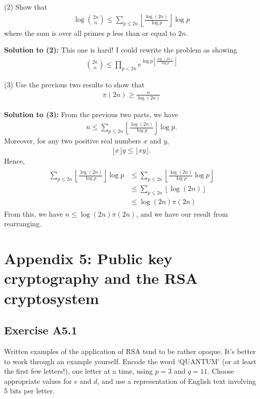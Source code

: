 \documentclass{book}
\begin{document}
    (2) Show that
    \begin{align}
        \log \binom{2n}{n} \leq \sum_{p\leq2n} \left\lfloor\frac{\log(2n)}{\log p} \right\rfloor\log p
    \end{align}
    where the sum is over all primes $p$ less than or equal to $2n$.

    \textbf{Solution to (2):} This one is hard! I could rewrite the problem as showing
    \begin{align}
        \binom{2n}{n} \leq \prod_{p<2n}e^{\log p \left\lfloor\frac{\log(2n)}{\log p}\right\rfloor}
    \end{align}

    (3) Use the previous two results to show that
    \begin{align}
        \pi(2n) \geq \frac{n}{\log(2n)}
    \end{align}

    \textbf{Solution to (3):} From the previous two parts, we have
    \begin{align}
        n \leq \sum_{p\leq2n} \left\lfloor\frac{\log(2n)}{\log p} \right\rfloor\log p.
    \end{align}
    Moreover, for any two positive real numbers $x$ and $y$,
    \begin{align}
        \lfloor x\rfloor y \leq \lfloor x y\rfloor.
    \end{align}
    Hence,
    \begin{align}
    \begin{aligned}
        \sum_{p\leq2n} \left\lfloor\frac{\log(2n)}{\log p} \right\rfloor\log p &\leq \sum_{p\leq2n} \left\lfloor\frac{\log(2n)}{\log p }\log p\right\rfloor \\
        &\leq \sum_{p\leq2n} \left\lfloor\log(2n)\right\rfloor\\
        &\leq \log(2n) \pi(2n)
    \end{aligned}
    \end{align}
    From this, we have $n \leq \log(2n) \pi(2n)$, and we have our result from rearranging.


\chapter*{Appendix 5: Public key cryptography and the RSA cryptosystem}


\section*{Exercise A5.1} 
    Written examples of the application of RSA tend to be rather opaque. It’s better to work through an example yourself. Encode the word ‘QUANTUM’ (or at least the first few letters!), one letter at a time, using $p=3$ and $q=11$. Choose appropriate values for $e$ and $d$, and use a representation of English text involving 5 bits per letter.
    
\end{document}
